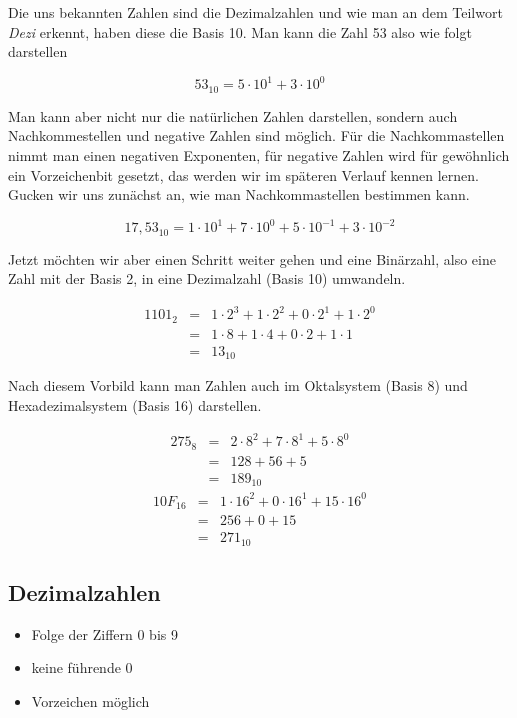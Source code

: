 Die uns bekannten Zahlen sind die Dezimalzahlen und wie man an dem Teilwort {\em Dezi} erkennt, haben diese die Basis 10. Man kann die Zahl 53 also wie folgt darstellen 


$$53_{10} = 5 \cdot 10^{1} + 3 \cdot 10^{0}$$

Man kann aber nicht nur die natürlichen Zahlen darstellen, sondern auch Nachkommestellen und negative Zahlen sind möglich. Für die Nachkommastellen nimmt man einen negativen Exponenten, für negative Zahlen wird für gewöhnlich ein Vorzeichenbit gesetzt, das werden wir im späteren Verlauf kennen lernen. Gucken wir uns zunächst an, wie man Nachkommastellen bestimmen kann.

$$17,53_{10} = 1 \cdot 10^{1} + 7 \cdot 10^{0} + 5 \cdot 10^{-1} + 3 \cdot 10^{-2}$$

Jetzt möchten wir aber einen Schritt weiter gehen und eine Binärzahl, also eine Zahl mit der Basis 2, in eine Dezimalzahl (Basis 10) umwandeln.

\begin{eqnarray}
1101_{2} & = & 1 \cdot 2^{3} + 1 \cdot 2^{2} + 0 \cdot 2^{1} + 1 \cdot 2^{0} \\
& = & 1 \cdot 8 + 1 \cdot 4 + 0 \cdot 2 + 1 \cdot 1 \\
& = & 13_{10}
\end{eqnarray}

Nach diesem Vorbild kann man Zahlen auch im Oktalsystem (Basis 8) und Hexadezimalsystem (Basis 16) darstellen.

\begin{eqnarray}
275_{8} & = & 2 \cdot 8^{2} + 7 \cdot 8^{1} + 5 \cdot 8^{0} \\
& = & 128 + 56 + 5 \\
& = & 189_{10}
\end{eqnarray}
\begin{eqnarray}
10F_{16} & = & 1 \cdot 16^{2} + 0 \cdot 16^{1} + 15 \cdot 16^{0} \\
& = & 256 + 0 + 15 \\ 
& = & 271_{10}
\end{eqnarray}

\subsection{Dezimalzahlen}

\begin{itemize}
\item Folge der Ziffern 0 bis 9
\item keine führende 0
\item Vorzeichen möglich
\end{itemize}

